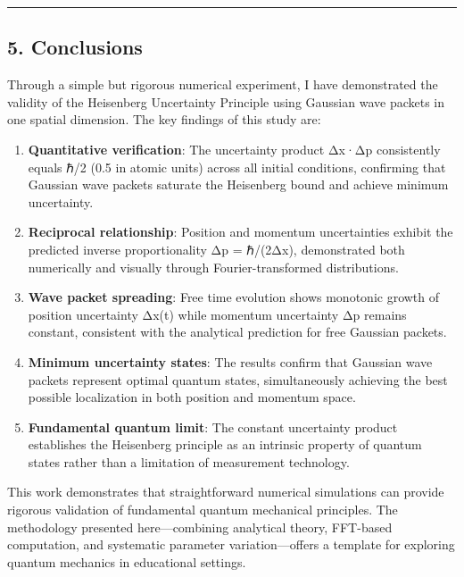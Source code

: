 \documentclass[
]{article}
\begin{document}
\begin{center}\rule{0.5\linewidth}{0.5pt}\end{center}

\subsection{5. Conclusions}\label{conclusions}

Through a simple but rigorous numerical experiment, I have demonstrated
the validity of the Heisenberg Uncertainty Principle using Gaussian wave
packets in one spatial dimension. The key findings of this study are:

\begin{enumerate}
\def\labelenumi{\arabic{enumi}.}
\item
  \textbf{Quantitative verification}: The uncertainty product Δx·Δp
  consistently equals ℏ/2 (0.5 in atomic units) across all initial
  conditions, confirming that Gaussian wave packets saturate the
  Heisenberg bound and achieve minimum uncertainty.
\item
  \textbf{Reciprocal relationship}: Position and momentum uncertainties
  exhibit the predicted inverse proportionality Δp = ℏ/(2Δx),
  demonstrated both numerically and visually through Fourier-transformed
  distributions.
\item
  \textbf{Wave packet spreading}: Free time evolution shows monotonic
  growth of position uncertainty Δx(t) while momentum uncertainty Δp
  remains constant, consistent with the analytical prediction for free
  Gaussian packets.
\item
  \textbf{Minimum uncertainty states}: The results confirm that Gaussian
  wave packets represent optimal quantum states, simultaneously
  achieving the best possible localization in both position and momentum
  space.
\item
  \textbf{Fundamental quantum limit}: The constant uncertainty product
  establishes the Heisenberg principle as an intrinsic property of
  quantum states rather than a limitation of measurement technology.
\end{enumerate}

This work demonstrates that straightforward numerical simulations can
provide rigorous validation of fundamental quantum mechanical
principles. The methodology presented here---combining analytical
theory, FFT-based computation, and systematic parameter
variation---offers a template for exploring quantum mechanics in
educational settings.
\end{document}
